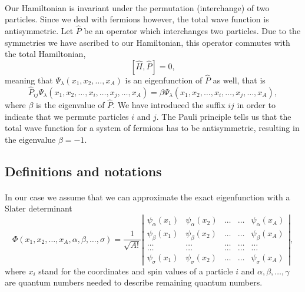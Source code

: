 \documentclass[%
twoside,                 %
final,                   %
10pt]{article}
\begin{document}
\paragraph{}
Our Hamiltonian is invariant under the permutation (interchange) of two particles. %
Since we deal with fermions however, the total wave function is antisymmetric.
Let $\hat{P}$ be an operator which interchanges two particles.
Due to the symmetries we have ascribed to our Hamiltonian, this operator commutes with the total Hamiltonian,
\[
[\hat{H},\hat{P}] = 0,
 \]
meaning that $\Psi_{\lambda}(x_1, x_2, \dots , x_A)$ is an eigenfunction of 
$\hat{P}$ as well, that is
\[
\hat{P}_{ij}\Psi_{\lambda}(x_1, x_2, \dots,x_i,\dots,x_j,\dots,x_A)=
\beta\Psi_{\lambda}(x_1, x_2, \dots,x_i,\dots,x_j,\dots,x_A),
\]
where $\beta$ is the eigenvalue of $\hat{P}$. We have introduced the suffix $ij$ in order to indicate that we permute particles $i$ and $j$.
The Pauli principle tells us that the total wave function for a system of fermions
has to be antisymmetric, resulting in the eigenvalue $\beta = -1$.



\subsection*{Definitions and notations}

\paragraph{}
In our case we assume that  we can approximate the exact eigenfunction with a Slater determinant
\begin{equation}
   \Phi(x_1, x_2,\dots ,x_A,\alpha,\beta,\dots, \sigma)=\frac{1}{\sqrt{A!}}
\left| \begin{array}{ccccc} \psi_{\alpha}(x_1)& \psi_{\alpha}(x_2)& \dots & \dots & \psi_{\alpha}(x_A)\\
                            \psi_{\beta}(x_1)&\psi_{\beta}(x_2)& \dots & \dots & \psi_{\beta}(x_A)\\  
                            \dots & \dots & \dots & \dots & \dots \\
                            \dots & \dots & \dots & \dots & \dots \\
                     \psi_{\sigma}(x_1)&\psi_{\sigma}(x_2)& \dots & \dots & \psi_{\sigma}(x_A)\end{array} \right|, \label{eq:HartreeFockDet}
\end{equation}
where  $x_i$  stand for the coordinates and spin values of a particle $i$ and $\alpha,\beta,\dots, \gamma$ 
are quantum numbers needed to describe remaining quantum numbers.
\end{document}

